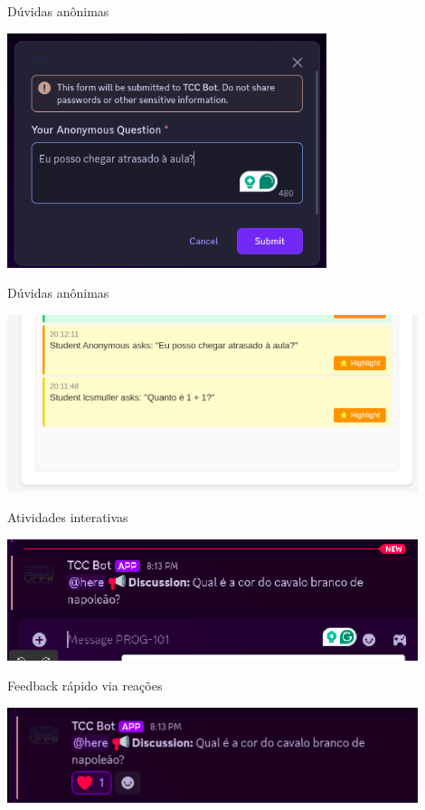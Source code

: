 \documentclass[aspectratio=169]{beamer}
\begin{document}
{\begin{frame}{Dúvidas anônimas}
  \begin{center}
    \includegraphics[width=0.7\textwidth]{func-alunos/3.png}
  \end{center}
\end{frame}

\begin{frame}{Dúvidas anônimas}
  \begin{center}
    \includegraphics[width=0.9\textwidth]{func-alunos/4.png}
  \end{center}
\end{frame}

\begin{frame}{Atividades interativas}
  \begin{center}
    \includegraphics[width=0.9\textwidth]{func-alunos/5.png}
  \end{center}
\end{frame}

\begin{frame}{Feedback rápido via reações}
  \begin{center}
    \includegraphics[width=0.9\textwidth]{func-alunos/1.png}
  \end{center}
\end{frame}

}
\end{document}
